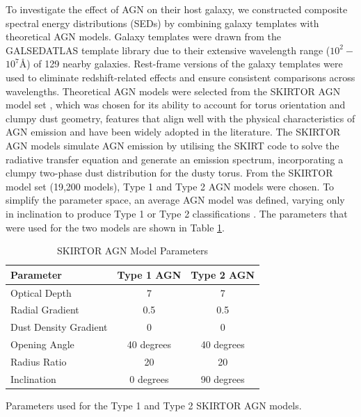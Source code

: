 \documentclass[
  journal=pasa,
  manuscript=research-paper,
  year=202X,
  volume=YY,
]{cup-journal}
\begin{document}
To investigate the effect of AGN on their host galaxy, we constructed composite spectral energy distributions (SEDs) by combining galaxy templates with theoretical AGN models. Galaxy templates were drawn from the GALSEDATLAS template library \citep{brown_atlas_2014} due to their extensive wavelength range ($10^2 -$$10^7${\AA}) of 129 nearby galaxies. Rest-frame versions of the galaxy templates were used to eliminate redshift-related effects and ensure consistent comparisons across wavelengths. Theoretical AGN models were selected from the SKIRTOR AGN model set \citep{stalevski_3d_2012, stalevski_dust_2016}, which was chosen for its ability to account for torus orientation and clumpy dust geometry, features that align well with the physical characteristics of AGN emission and have been widely adopted in the literature. The SKIRTOR AGN models simulate AGN emission by utilising the SKIRT code \citep{camps_skirt_2015} to solve the radiative transfer equation and generate an emission spectrum, incorporating a clumpy two-phase dust distribution for the dusty torus. From the SKIRTOR model set (19,200 models), Type 1 and Type 2 AGN models were chosen. To simplify the parameter space, an average AGN model was defined, varying only in inclination to produce Type 1 or Type 2 classifications \citep{ciesla_constraining_2015}. The parameters that were used for the two models are shown in Table \ref{tab:agn_parameters}.

\begin{table}[hbt!]
\begin{threeparttable}
\caption{SKIRTOR AGN Model Parameters}
\label{tab:agn_parameters}
\begin{tabular}{lcc}
\toprule
\headrow Parameter & Type 1 AGN & Type 2 AGN \\
\midrule
Optical Depth & 7 & 7 \\
Radial Gradient & 0.5 & 0.5 \\
Dust Density Gradient & 0 & 0 \\
Opening Angle & 40 degrees & 40 degrees \\
Radius Ratio & 20 & 20 \\
Inclination & 0 degrees & 90 degrees \\
\bottomrule
\end{tabular}
\begin{tablenotes}[hang]
\item[] Parameters used for the Type 1 and Type 2 SKIRTOR AGN models.
\end{tablenotes}
\end{threeparttable}
\end{table}
\end{document}
